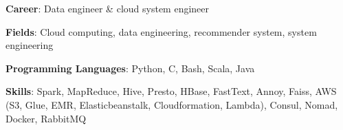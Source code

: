 

\begin{cventries}
    \cvsimpleentry
        { %
            \begin{cvitems}
                \item{
                    {\bf Career}: Data engineer \& cloud system engineer \nn
                }
                \item{
                    {\bf Fields}: Cloud computing, data engineering, recommender system, system engineering \nn
                }
                \item{
                    {\bf Programming Languages}: Python, C, Bash, Scala, Java \nn
                }
                \item{
                    {\bf Skills}: Spark, MapReduce, Hive, Presto, HBase, FastText, Annoy, Faiss, AWS (S3, Glue, EMR, Elasticbeanstalk, Cloudformation, Lambda), Consul, Nomad, Docker, RabbitMQ\nn
                }
            \end{cvitems}
        }
\end{cventries}